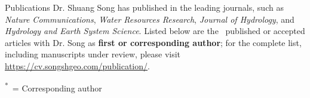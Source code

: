 \documentclass{resume} %
\begin{document}
\begin{rSection}{Publications}
\textnormal{Dr. Shuang Song has published in the leading journals, such as \textit{Nature Communications}, \textit{Water Resources Research}, \textit{Journal of Hydrology}, and \textit{Hydrology and Earth System Science}. Listed below are the \GetTotalCount~published or accepted articles with Dr. Song as \textbf{first or corresponding author}; for the complete list, including manuscripts under review, please visit \url{https://cv.songshgeo.com/publication/}.}

\newrefsection
\nocite{*}
\printbibliography[
    type=article,
    heading=none,
    keyword={cv-selected},
    notkeyword={cv-unpublished},
    notkeyword={duplicate-zh},
]
\endrefsection

\vspace{0.4em}
\textnormal{\textsuperscript{*}~= Corresponding author}

\end{rSection}

\end{document}
